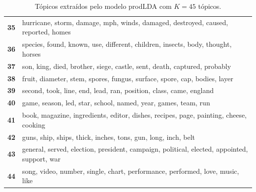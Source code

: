 \begin{table}[htpb]
\begin{tabularx}{\textwidth}{@{}l X@{}}
        \textbf{35} & hurricane, storm, damage, mph, winds, damaged, destroyed, caused, reported, homes \\
        \textbf{36} & species, found, known, use, different, children, insects, body, thought, horses \\
        \textbf{37} & son, king, died, brother, siege, castle, sent, death, captured, probably \\
        \textbf{38} & fruit, diameter, stem, spores, fungus, surface, spore, cap, bodies, layer \\
        \textbf{39} & second, took, line, end, lead, ran, position, class, came, england \\
        \textbf{40} & game, season, led, star, school, named, year, games, team, run \\
        \textbf{41} & book, magazine, ingredients, editor, dishes, recipes, page, painting, cheese, cooking \\
        \textbf{42} & guns, ship, ships, thick, inches, tons, gun, long, inch, belt \\
        \textbf{43} & general, served, election, president, campaign, political, elected, appointed, support, war \\
        \textbf{44} & song, video, number, single, chart, performance, performed, love, music, like \\
        \bottomrule
    \end{tabularx}
    \caption{Tópicos extraídos pelo modelo prodLDA com $K=45$ tópicos.}
    \label{tab:topicos_prodlda_45}
\end{table}
